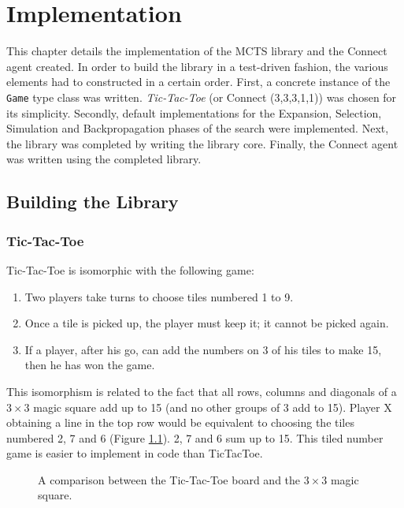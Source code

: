 \chapter{Implementation}
This chapter details the implementation of the {MCTS} library and the {Connect} agent created.
In order to build the library in a test-driven fashion, the various elements had to constructed in a certain order. First, a concrete instance of the \texttt{Game} type class was written. \textit{Tic-Tac-Toe} (or {Connect} (3,3,3,1,1)) was chosen for its simplicity. Secondly, default implementations for the {Expansion}, {Selection}, {Simulation} and {Backpropagation} phases of the search were implemented. Next, the library was completed by writing the library core. Finally, the {Connect} agent was written using the completed library.
\section{Building the Library}
\subsection{{Tic-Tac-Toe}\label{sec:ttt}\label{sec:arbitrary}}
{Tic-Tac-Toe} is isomorphic with the following game:
\begin{enumerate}
\item Two players take turns to choose tiles numbered 1 to 9.
\item Once a tile is picked up, the player must keep it; it cannot be picked again.
\item If a player, after his go, can add the numbers on 3 of his tiles to make 15, then he has won the game.
\end{enumerate}

This isomorphism is related to the fact that all rows, columns and diagonals of a $3 \times 3$ magic square add up to 15 (and no other groups of 3 add to 15).  Player X obtaining a line in the top row would be equivalent to choosing the tiles numbered 2, 7 and 6 (Figure \ref{fig:tttms}). 2, 7 and 6 sum up to 15. This tiled number game is easier to implement in code than {TicTacToe}. 

\begin{figure}
\centering

\caption{A comparison between the {Tic-Tac-Toe} board and the $3 \times 3$ magic square.}
\label{fig:tttms}
\end{figure}


